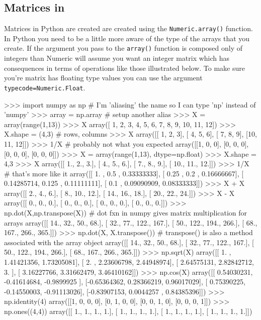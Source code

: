\subsection{Matrices in \numpy}

Matrices in Python are created are created using the
\lstinline!Numeric.array()! function. In Python you need to be a little
more aware of the type of the arrays that you create. If the argument
you pass to the \lstinline!array()! function is composed only of
integers than Numeric will assume you want an integer matrix which has
consequences in terms of operations like those illustrated below. To
make sure you're matrix has floating type values you can use the
argument \lstinline!typecode=Numeric.Float!.

\begin{python}
>>> import numpy as np # I'm 'aliasing' the name so I can type 'np' instead of 'numpy'
>>> array = np.array # setup another alias
>>> X = array(range(1,13))
>>> X
array([ 1,  2,  3,  4,  5,  6,  7,  8,  9, 10, 11, 12])
>>> X.shape = (4,3) # rows, columns
>>> X
array([[ 1,  2,  3],
       [ 4,  5,  6],
       [ 7,  8,  9],
       [10, 11, 12]])
>>> 1/X # probably not what you expected
array([[1, 0, 0],
       [0, 0, 0],
       [0, 0, 0],
       [0, 0, 0]])
>>> X = array(range(1,13), dtype=np.float)
>>> X.shape = 4,3
>>> X
array([[  1.,   2.,   3.],
       [  4.,   5.,   6.],
       [  7.,   8.,   9.],
       [ 10.,  11.,  12.]])
>>> 1/X # that's more like it
array([[ 1.        ,  0.5       ,  0.33333333],
       [ 0.25      ,  0.2       ,  0.16666667],
       [ 0.14285714,  0.125     ,  0.11111111],
       [ 0.1       ,  0.09090909,  0.08333333]])
>>> X + X
array([[  2.,   4.,   6.],
       [  8.,  10.,  12.],
       [ 14.,  16.,  18.],
       [ 20.,  22.,  24.]])
>>> X - X
array([[ 0.,  0.,  0.],
       [ 0.,  0.,  0.],
       [ 0.,  0.,  0.],
       [ 0.,  0.,  0.]])
>>> np.dot(X,np.transpose(X)) # dot fxn in numpy gives matrix multiplication for arrays
array([[  14.,   32.,   50.,   68.],
       [  32.,   77.,  122.,  167.],
       [  50.,  122.,  194.,  266.],
       [  68.,  167.,  266.,  365.]])
>>> np.dot(X, X.transpose())  # transpose() is also a method associated with the array object
array([[  14.,   32.,   50.,   68.],
       [  32.,   77.,  122.,  167.],
       [  50.,  122.,  194.,  266.],
       [  68.,  167.,  266.,  365.]])
>>> np.sqrt(X)
array([[ 1.        ,  1.41421356,  1.73205081],
       [ 2.        ,  2.23606798,  2.44948974],
       [ 2.64575131,  2.82842712,  3.        ],
       [ 3.16227766,  3.31662479,  3.46410162]])
>>> np.cos(X)
array([[ 0.54030231, -0.41614684, -0.9899925 ],
       [-0.65364362,  0.28366219,  0.96017029],
       [ 0.75390225, -0.14550003, -0.91113026],
       [-0.83907153,  0.0044257 ,  0.84385396]])
>>> np.identity(4)
array([[1, 0, 0, 0],
       [0, 1, 0, 0],
       [0, 0, 1, 0],
       [0, 0, 0, 1]])
>>> np.ones((4,4))
array([[ 1.,  1.,  1.,  1.],
       [ 1.,  1.,  1.,  1.],
       [ 1.,  1.,  1.,  1.],
       [ 1.,  1.,  1.,  1.]])
\end{python}
